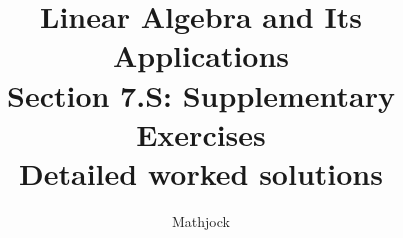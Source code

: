 
\title{\textbf{Linear Algebra and Its Applications}\\[0.3em]Section 7.S: Supplementary Exercises\\[0.3em]\large Detailed worked solutions}
\author{Mathjock}
\date{}

\maketitle
\bookinfo
\tableofcontents
\clearpage
\renewcommand{\thesection}{7.S}
\renewcommand{\theHsection}{7.S}
\setcounter{section}{0}


